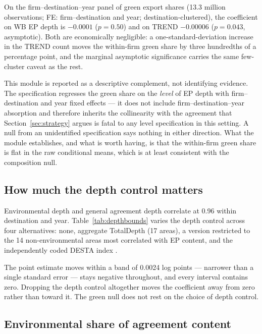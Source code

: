 \documentclass[12pt]{article}
\begin{document}
On the firm--destination--year panel of green export shares (13.3 million observations;
FE: firm--destination and year; destination-clustered), the coefficient on WB EP depth
is $-0.0001$ ($p = 0.50$) and on TREND $-0.00006$ ($p = 0.043$, asymptotic). Both are
economically negligible: a one-standard-deviation increase in the TREND count moves the
within-firm green share by three hundredths of a percentage point, and the marginal
asymptotic significance carries the same few-cluster caveat as the rest.

This module is reported as a descriptive complement, not identifying evidence. The
specification regresses the green share on the \emph{level} of EP depth with
firm--destination and year fixed effects --- it does not include firm--destination--year
absorption and therefore inherits the collinearity with the agreement that
Section~\ref{sec:strategy} argues is fatal to any level specification in this setting. A
null from an unidentified specification says nothing in either direction. What the module
establishes, and what is worth having, is that the within-firm green share is flat in the
raw conditional means, which is at least consistent with the composition null.

\subsection{How much the depth control matters}

Environmental depth and general agreement depth correlate at 0.96 within destination and
year. Table~\ref{tab:depthbounds} varies the depth control across four alternatives: none,
aggregate TotalDepth (17 areas), a version restricted to the 14 non-environmental areas
most correlated with EP content, and the independently coded DESTA index \citep{dur2014}.

\begin{table}[htbp]
\centering
\caption{EP$\times$green under alternative depth controls (collapsed panel, WB index)}
\label{tab:depthbounds}

\end{table}

The point estimate moves within a band of 0.0024 log points --- narrower than a single
standard error --- stays negative throughout, and every interval contains zero. Dropping
the depth control altogether moves the coefficient away from zero rather than toward it.
The green null does not rest on the choice of depth control.

\subsection{Environmental share of agreement content}
\end{document}
